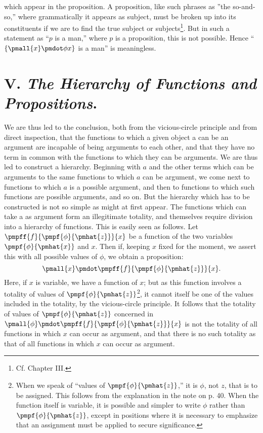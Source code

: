 \documentclass[letterpaper,12pt,openany,leqno]{book}
\begin{document}
which appear in the proposition. A proposition, like such phrases as ''the so-and-so,'' where grammatically it appears as subject, must be broken up into its constituents if we are to find the true subject or subjects\footnote{Cf. Chapter III.}. But in such a statement as ``$p$ is a man,'' where $p$ is a proposition, this is not possible. Hence ``$\{\pmall{x}\pmdot \phi x\}$ is a man'' is meaningless.

\section*{\centering V. \textit{The Hierarchy of Functions and Propositions}.}

We are thus led to the conclusion, both from the vicious-circle principle and from direct inspection, that the functions to which a given object a can be an argument are incapable of being arguments to each other, and that they have no term in common with the functions to which they can be arguments. We are thus led to construct a hierarchy. Beginning with $a$ and the other terms which can be arguments to the same functions to which $a$ can be argument, we come next to functions to which $a$ is a possible argument, and then to functions to which such functions are possible arguments, and so on. But the hierarchy which has to be constructed is not so simple as might at first appear. The functions which can take a as argument form an illegitimate totality, and themselves require division into a hierarchy of functions. This is easily seen as follows. Let $\pmpff{f}{\pmpf{\phi}{\pmhat{z}}}{x}$ be a function of the two variables $\pmpf{\phi}{\pmhat{x}}$ and $x$. Then if, keeping $x$ fixed for the moment, we assert this with all possible values of $\phi$, we obtain a proposition:
\[  
	\pmall{x}\pmdot \pmpff{f}{\pmpf{\phi}{\pmhat{z}}}{x}.
\]
Here, if $x$ is variable, we have a function of $x$; but as this function involves a totality of values of $\pmpf{\phi}{\pmhat{z}}$\footnote{When we speak of ``values of $\pmpf{\phi}{\pmhat{z}}$,'' it is $\phi$, not $z$, that is to be assigned. This follows from the explanation in the note on p. 40. When the function itself is variable, it is possible and simpler to write $\phi$ rather than $\pmpf{\phi}{\pmhat{z}}$, except in positions where it is necessary to emphasize that an assignment must be applied to secure significance.}, it cannot itself be one of the values included in the totality, by the vicious-circle principle. It follows that the totality of values of $\pmpf{\phi}{\pmhat{z}}$ concerned in $\pmall{\phi}\pmdot \pmpff{f}{\pmpf{\phi}{\pmhat{z}}}{x}$ is not the totality of all functions in which $x$ can occur as argument, and that there is no such totality as that of all functions in which $x$ can occur as argument. 
\end{document}
